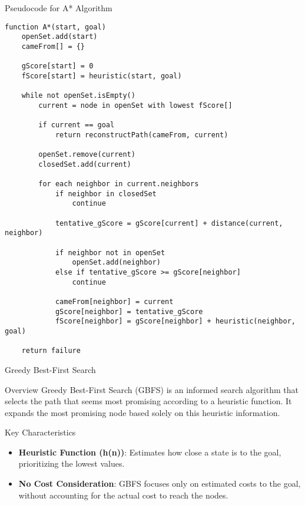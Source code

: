 \documentclass[aspectratio=169]{beamer}
\begin{document}
\begin{frame}[fragile]{Pseudocode for A* Algorithm}
    \begin{lstlisting}[language=plaintext]
function A*(start, goal)
    openSet.add(start)
    cameFrom[] = {}

    gScore[start] = 0
    fScore[start] = heuristic(start, goal)

    while not openSet.isEmpty()
        current = node in openSet with lowest fScore[]

        if current == goal
            return reconstructPath(cameFrom, current)

        openSet.remove(current)
        closedSet.add(current)

        for each neighbor in current.neighbors
            if neighbor in closedSet
                continue

            tentative_gScore = gScore[current] + distance(current, neighbor)

            if neighbor not in openSet
                openSet.add(neighbor)
            else if tentative_gScore >= gScore[neighbor]
                continue

            cameFrom[neighbor] = current
            gScore[neighbor] = tentative_gScore
            fScore[neighbor] = gScore[neighbor] + heuristic(neighbor, goal)

    return failure
    \end{lstlisting}
\end{frame}

\begin{frame}[fragile]{Greedy Best-First Search}
    \begin{block}{Overview}
        Greedy Best-First Search (GBFS) is an informed search algorithm that selects the path that seems most promising according to a heuristic function. It expands the most promising node based solely on this heuristic information.
    \end{block}
\end{frame}

\begin{frame}[fragile]{Key Characteristics}
    \begin{itemize}
        \item \textbf{Heuristic Function (h(n))}: Estimates how close a state is to the goal, prioritizing the lowest values.
        \item \textbf{No Cost Consideration}: GBFS focuses only on estimated costs to the goal, without accounting for the actual cost to reach the nodes.
    \end{itemize}
\end{frame}
\end{document}
